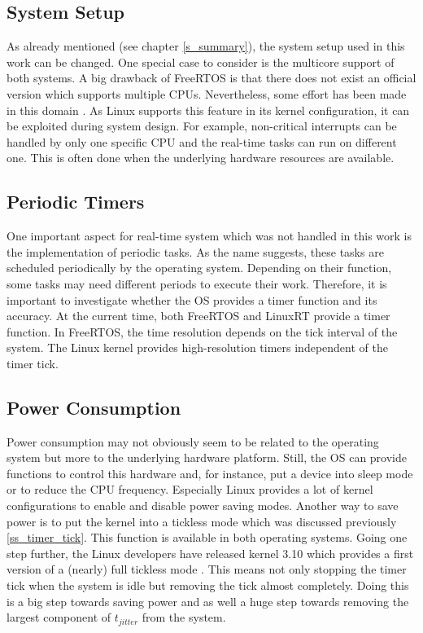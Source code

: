 \subsection{System Setup}
As already mentioned (see chapter \ref{s_summary}), the system setup used in this work can be changed.
One special case to consider is the multicore support of both systems.
A big drawback of FreeRTOS is that there does not exist an official version which supports multiple \acp{CPU}.
Nevertheless, some effort has been made in this domain \cite{mistry:affmaer}.
As Linux supports this feature in its kernel configuration, it can be exploited during system design.
For example, non-critical interrupts can be handled by only one specific \ac{CPU} and the real-time tasks can run on different one.
This is often done when the underlying hardware resources are available. 

\subsection{Periodic Timers}
One important aspect for real-time system which was not handled in this work is the implementation of periodic tasks.
As the name suggests, these tasks are scheduled periodically by the operating system.
Depending on their function, some tasks may need different periods to execute their work.
Therefore, it is important to investigate whether the \ac{OS} provides a timer function and its accuracy.
At the current time, both FreeRTOS and LinuxRT provide a timer function.
In FreeRTOS, the time resolution depends on the tick interval of the system.
The Linux kernel provides high-resolution timers independent of the timer tick.

\subsection{Power Consumption}
Power consumption may not obviously seem to be related to the operating system but more to the underlying hardware platform.
Still, the \ac{OS} can provide functions to control this hardware and, for instance, put a device into sleep mode or to reduce the \ac{CPU} frequency.
Especially Linux provides a lot of kernel configurations to enable and disable power saving modes.
Another way to save power is to put the kernel into a tickless mode which was discussed previously \ref{ss_timer_tick}.
This function is available in both operating systems.
Going one step further, the Linux developers have released kernel 3.10 which provides a first version of a (nearly) full tickless mode \cite{corbet:nftoi}.
This means not only stopping the timer tick when the system is idle but removing the tick almost completely. 
Doing this is a big step towards saving power and as well a huge step towards removing the largest component of $t_{jitter}$ from the system.

